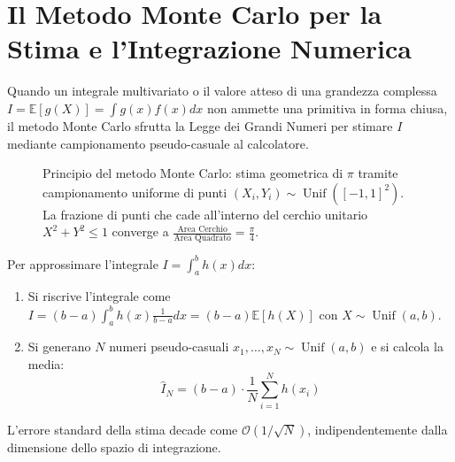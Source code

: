 \section{Il Metodo Monte Carlo per la Stima e l'Integrazione Numerica}
\label{sec:monte_carlo_teoria}

Quando un integrale multivariato o il valore atteso di una grandezza complessa $I = \mathbb{E}[g(X)] = \int g(x) f(x) dx$ non ammette una primitiva in forma chiusa, il metodo Monte Carlo sfrutta la Legge dei Grandi Numeri per stimare $I$ mediante campionamento pseudo-casuale al calcolatore.

\begin{figure}[htbp]
    \centering
    
    \caption{Principio del metodo Monte Carlo: stima geometrica di $\pi$ tramite campionamento uniforme di punti $(X_i, Y_i) \sim \operatorname{Unif}([-1,1]^2)$. La frazione di punti che cade all'interno del cerchio unitario $X^2 + Y^2 \le 1$ converge a $\frac{\text{Area Cerchio}}{\text{Area Quadrato}} = \frac{\pi}{4}$.}
    \label{fig:monte_carlo_cerchio}
\end{figure}

\begin{metodo}
Per approssimare l'integrale $I = \int_a^b h(x) dx$:
\begin{enumerate}
    \item Si riscrive l'integrale come $I = (b - a) \int_a^b h(x) \frac{1}{b-a} dx = (b - a) \mathbb{E}[h(X)]$ con $X \sim \operatorname{Unif}(a, b)$.
    \item Si generano $N$ numeri pseudo-casuali $x_1, \dots, x_N \sim \operatorname{Unif}(a, b)$ e si calcola la media:
    \begin{equation}
        \widehat{I}_N = (b - a) \cdot \frac{1}{N}\sum_{i=1}^N h(x_i)
    \end{equation}
\end{enumerate}
L'errore standard della stima decade come $\mathcal{O}(1/\sqrt{N})$, indipendentemente dalla dimensione dello spazio di integrazione.
\end{metodo}
